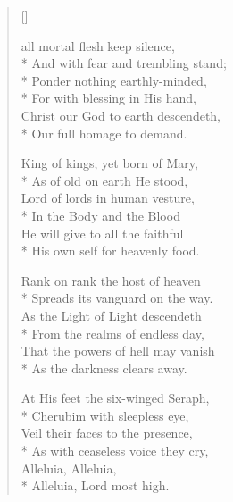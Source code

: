 \newHymn
{}

\begin{verse}[\versewidth]
\begin{altverse}
 all mortal flesh keep silence,\\*
And with fear and trembling stand;\\*
Ponder nothing earthly-minded,\\*
For with blessing in His hand,\\
Christ our God to earth descendeth,\\*
Our full homage to demand. 
\end{altverse}

\begin{altverse}
 King of kings, yet born of Mary,\\*
As of old on earth He stood,\\
Lord of lords in human vesture,\\*
In the Body and the Blood\\
He will give to all the faithful\\*
His own self for heavenly
food. 
\end{altverse}

\begin{altverse}
 Rank on rank the host of heaven\\*
Spreads its vanguard on the way.\\
As the Light of Light descendeth\\*
From the realms of endless day,\\
That the powers of hell may vanish\\*
As the darkness clears away.
\end{altverse}

\begin{altverse}
 At His feet the six-winged Seraph,\\*
Cherubim with sleepless eye,\\
Veil their faces to the presence,\\*
As with ceaseless voice they cry,\\
Alleluia, Alleluia,\\*
Alleluia, Lord most high.
\end{altverse}

\end{verse}




